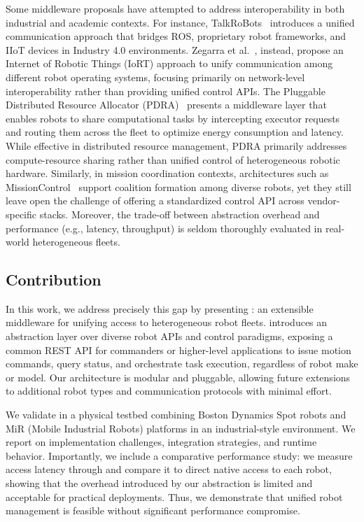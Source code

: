 \documentclass[conference]{IEEEtran}
\begin{document}
Some middleware proposals have attempted to address interoperability in both industrial and academic contexts. 
%
For instance,
 TalkRoBots~\cite{ayaida2022fi} introduces a unified communication approach that bridges ROS, proprietary robot frameworks, 
 and IIoT devices in Industry 4.0 environments. 
% 
Zegarra et al.~\cite{cuadroszegarra2024jsan}, instead, propose an Internet of Robotic Things (IoRT) approach 
 to unify communication among different robot operating systems, focusing primarily on network-level interoperability 
 rather than providing unified control APIs. 
% 
The Pluggable Distributed Resource Allocator (PDRA)~\cite{rossi2020iros} presents a middleware layer that enables robots 
 to share computational tasks by intercepting executor requests and routing them across the fleet 
 to optimize energy consumption and latency. 
% 
While effective in distributed resource management, 
PDRA primarily addresses compute-resource sharing rather than unified control of heterogeneous robotic hardware. 
%
Similarly, in mission coordination contexts, architectures such as MissionControl~\cite{rodrigues2022jss} 
 support coalition formation among diverse robots, yet they still leave open the challenge of offering 
 a standardized control API across vendor-specific stacks.
%
Moreover, the trade-off between abstraction overhead and performance (e.g., latency, throughput) 
 is seldom thoroughly evaluated in real-world heterogeneous fleets.

\subsection{Contribution}
In this work, 
 we address precisely this gap by presenting \approach{}:
 an extensible middleware for unifying access to heterogeneous robot fleets. 
% 
\approach{} introduces an abstraction layer over diverse robot APIs and control paradigms, 
 exposing a common REST API for commanders or higher-level applications to issue motion commands, 
 query status, and orchestrate task execution, regardless of robot make or model. 
% 
Our architecture is modular and pluggable, 
 allowing future extensions to additional robot types and communication protocols with minimal effort.

We validate \approach{} in a physical testbed combining Boston Dynamics Spot robots 
 and MiR (Mobile Industrial Robots) platforms in an industrial-style environment. 
% 
We report on implementation challenges, integration strategies, and runtime behavior. 
%
Importantly, we include a comparative performance study: 
 we measure access latency through \approach{} and compare it to direct native access to each robot, 
 showing that the overhead introduced by our abstraction is limited and acceptable for practical deployments. 
% 
Thus, we demonstrate that unified robot management is feasible without significant performance compromise.
\end{document}
